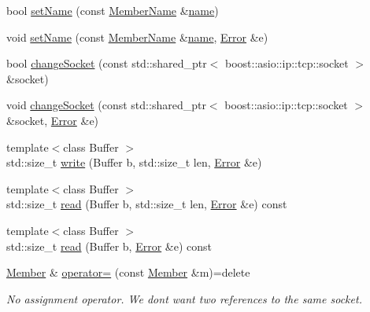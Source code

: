 \begin{DoxyCompactItemize}
\item 
bool \hyperlink{classshaan97_1_1sync_1_1_member_a0155629541879dc52bfd332701a3aff5}{set\+Name} (const \hyperlink{namespaceshaan97_1_1sync_af59c2c9185f7cde547b79fbe0bf8ec71}{Member\+Name} \&\hyperlink{classshaan97_1_1sync_1_1_member_a42e3bc15f330702c4deac3dab4220c9b}{name})
\item 
void \hyperlink{classshaan97_1_1sync_1_1_member_acf773707b31068738756d9afabe39aea}{set\+Name} (const \hyperlink{namespaceshaan97_1_1sync_af59c2c9185f7cde547b79fbe0bf8ec71}{Member\+Name} \&\hyperlink{classshaan97_1_1sync_1_1_member_a42e3bc15f330702c4deac3dab4220c9b}{name}, \hyperlink{classshaan97_1_1sync_1_1_error}{Error} \&e)
\item 
bool \hyperlink{classshaan97_1_1sync_1_1_member_a9b6eb1387361250d01764797f89bdc1a}{change\+Socket} (const std\+::shared\+\_\+ptr$<$ boost\+::asio\+::ip\+::tcp\+::socket $>$ \&socket)
\item 
void \hyperlink{classshaan97_1_1sync_1_1_member_a7efb120c7f0020990ec0bb481053370a}{change\+Socket} (const std\+::shared\+\_\+ptr$<$ boost\+::asio\+::ip\+::tcp\+::socket $>$ \&socket, \hyperlink{classshaan97_1_1sync_1_1_error}{Error} \&e)
\item 
{\footnotesize template$<$class Buffer $>$ }\\std\+::size\+\_\+t \hyperlink{classshaan97_1_1sync_1_1_member_a94b2fe3391cadf9f0ac713fab86c792c}{write} (Buffer b, std\+::size\+\_\+t len, \hyperlink{classshaan97_1_1sync_1_1_error}{Error} \&e)
\item 
{\footnotesize template$<$class Buffer $>$ }\\std\+::size\+\_\+t \hyperlink{classshaan97_1_1sync_1_1_member_a258cd0c6ae7617ce17f7a36e78b95b85}{read} (Buffer b, std\+::size\+\_\+t len, \hyperlink{classshaan97_1_1sync_1_1_error}{Error} \&e) const
\item 
{\footnotesize template$<$class Buffer $>$ }\\std\+::size\+\_\+t \hyperlink{classshaan97_1_1sync_1_1_member_ab45388cff5245ca5afc2945a000b23ab}{read} (Buffer b, \hyperlink{classshaan97_1_1sync_1_1_error}{Error} \&e) const
\item 
\hyperlink{classshaan97_1_1sync_1_1_member}{Member} \& \hyperlink{classshaan97_1_1sync_1_1_member_aac54a26114acb5d975f162ab69bce538}{operator=} (const \hyperlink{classshaan97_1_1sync_1_1_member}{Member} \&m)=delete
\begin{DoxyCompactList}\small\item\em No assignment operator. We don\textquotesingle{}t want two references to the same socket. \end{DoxyCompactList}\item 

\end{DoxyCompactItemize}
